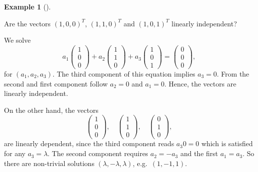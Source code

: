 \documentclass[
  a4paper,
  DIV=11,
  numbers=noendperiod,
  oneside]{scrreprt}
\theoremstyle{definition}
\newtheorem{example}{Example}[chapter]
\theoremstyle{remark}
\begin{document}
\begin{example}[]\protect\hypertarget{exm-}{}\label{exm-}

Are the vectors \((1,0,0)^{T}\), \((1,1,0)^{T}\) and \((1,0,1)^{T}\)
linearly independent?

We solve
\[a_{1} \scriptstyle \begin{pmatrix}   1 \\ 0 \\ 0  \end{pmatrix} \textstyle + a_{2} \scriptstyle \begin{pmatrix}   1 \\ 1 \\ 0  \end{pmatrix} \textstyle + a_{3} \scriptstyle \begin{pmatrix}   1 \\ 0 \\ 1  \end{pmatrix} \textstyle = \scriptstyle \begin{pmatrix}   0\\0\\0  \end{pmatrix} \textstyle,\]
for \((a_{1},a_{2},a_{3})\). The third component of this equation
implies \(a_{3}=0\). From the second and first component follow
\(a_{2}=0\) and \(a_{1} =0\). Hence, the vectors are linearly
independent.

On the other hand, the vectors
\[\scriptstyle \begin{pmatrix}   1 \\ 0 \\ 0  \end{pmatrix} \textstyle, \quad \scriptstyle \begin{pmatrix}   1 \\ 1 \\ 0  \end{pmatrix} \textstyle,  \quad \scriptstyle \begin{pmatrix}   0 \\ 1 \\ 0  \end{pmatrix} \textstyle,\]
are linearly dependent, since the third component reads \(a_{3} 0 = 0\)
which is satisfied for any \(a_{3}=\lambda\). The second component
requires \(a_{2} = - a_{3}\) and the first \(a_{1} = a_{3}\). So there
are non-trivial solutions \((\lambda , -\lambda , \lambda )\),
e.g.~\((1,-1,1)\).

\end{example}
\end{document}
